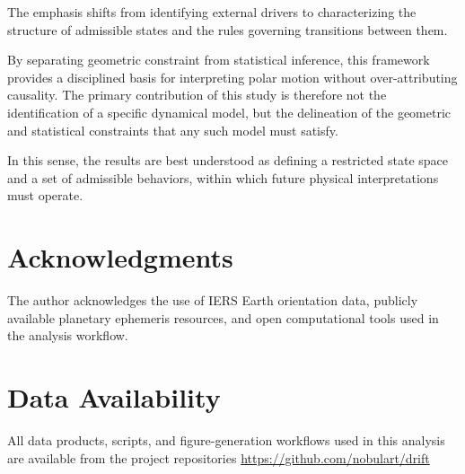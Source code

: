 \documentclass[twocolumn,9pt]{revtex4-2}
\begin{document}
The emphasis shifts from identifying external drivers to
characterizing the structure of admissible states and the
rules governing transitions between them.

By separating geometric constraint from statistical inference, this framework provides a disciplined basis for interpreting polar motion without over-attributing causality. The primary contribution of this study is therefore not the identification of a specific dynamical model, but the delineation of the geometric and statistical constraints that any such model must satisfy.

In this sense, the results are best understood as defining a restricted state space and a set of admissible behaviors, within which future physical interpretations must operate.

\section*{Acknowledgments}

The author acknowledges the use of IERS Earth orientation data, publicly available planetary ephemeris resources, and open computational tools used in the analysis workflow.

\section*{Data Availability}

All data products, scripts, and figure-generation workflows used in this analysis are available from the project repositories \url{https://github.com/nobulart/drift}
\end{document}
